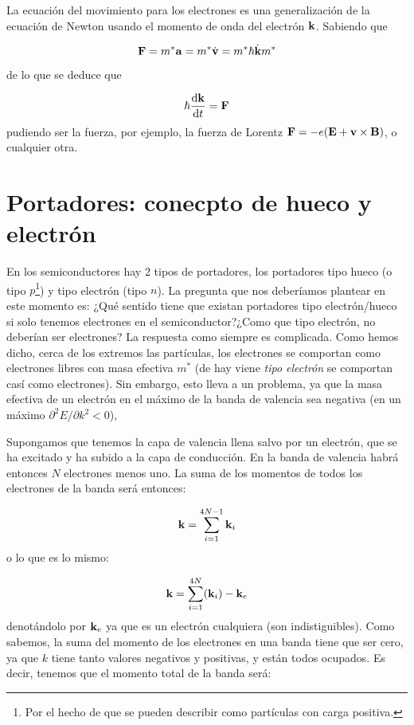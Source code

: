 La ecuación del movimiento para los electrones es una generalización de la ecuación de Newton usando el momento de onda del electrón $\mathbf{k}$. Sabiendo que

\begin{equation}
	\mathbf{F} = m^* \mathbf{a} = m^* \dot{\mathbf{v}} = m^* \hbar \dot{\mathbf{k}}{m^*}
\end{equation}
de lo que se deduce que

\begin{equation}
	\hbar \frac{\mathrm{d} \mathbf{k}}{\mathrm{d} t} = \mathbf{F}
\end{equation}
pudiendo ser la fuerza, por ejemplo, la fuerza de Lorentz $\mathbf{F}=-e(\mathbf{E}+\mathbf{v} \times \mathbf{B})$, o cualquier otra.

\section{Portadores: conecpto de hueco y electrón}

En los semiconductores hay 2 tipos de portadores, los portadores tipo hueco (o tipo $p$\footnote{Por el hecho de que se pueden describir como partículas con carga positiva.}) y tipo electrón (tipo $n$). La pregunta que nos deberíamos plantear en este momento es: ¿Qué sentido tiene que existan portadores tipo electrón/hueco si solo tenemos electrones en el semiconductor?¿Como que tipo electrón, no deberían ser electrones? La respuesta como siempre es complicada. Como hemos dicho, cerca de los extremos las partículas, los electrones se comportan como electrones libres con masa efectiva $m^*$ (de hay viene \textit{tipo electrón} se comportan casí como electrones). Sin embargo, esto lleva a un problema, ya que la masa efectiva de un electrón en el máximo de la banda de valencia sea negativa (en un máximo $\partial^2 E/ \partial k^2<0$),

Supongamos que tenemos la capa de valencia llena salvo por un electrón, que se ha excitado y ha subido a la capa de conducción. En la banda de valencia habrá entonces $N$ electrones menos uno. La suma de los momentos de todos los electrones de la banda será entonces:

\begin{equation}
	\mathbf{k} = \sum_{i=1}^{4N-1} \mathbf{k}_i
\end{equation}
o lo que es lo mismo:

\begin{equation}
	\mathbf{k} = \sum_{i=1}^{4N} (\mathbf{k}_i) - \mathbf{k}_e
\end{equation}
denotándolo por $\mathbf{k}_e$ ya que es un electrón cualquiera (son indistiguibles). Como sabemos, la suma del momento de los electrones en una banda tiene que ser cero, ya que $k$ tiene tanto valores negativos y positivas, y están todos ocupados. Es decir, tenemos que el momento total de la banda será:

